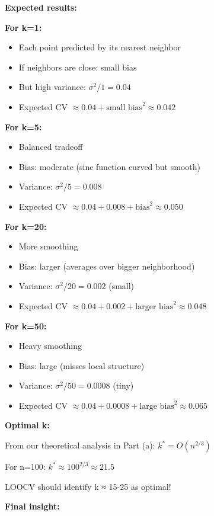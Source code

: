 \documentclass[12pt]{article}
\begin{document}
\begin{explanation}
\textbf{Expected results:}

\textbf{For k=1:}
\begin{itemize}
    \item Each point predicted by its nearest neighbor
    \item If neighbors are close: small bias
    \item But high variance: $\sigma^2/1 = 0.04$
    \item Expected CV $\approx 0.04 + \text{small bias}^2 \approx 0.042$
\end{itemize}

\textbf{For k=5:}
\begin{itemize}
    \item Balanced tradeoff
    \item Bias: moderate (sine function curved but smooth)
    \item Variance: $\sigma^2/5 = 0.008$
    \item Expected CV $\approx 0.04 + 0.008 + \text{bias}^2 \approx 0.050$
\end{itemize}

\textbf{For k=20:}
\begin{itemize}
    \item More smoothing
    \item Bias: larger (averages over bigger neighborhood)
    \item Variance: $\sigma^2/20 = 0.002$ (small)
    \item Expected CV $\approx 0.04 + 0.002 + \text{larger bias}^2 \approx 0.048$
\end{itemize}

\textbf{For k=50:}
\begin{itemize}
    \item Heavy smoothing
    \item Bias: large (misses local structure)
    \item Variance: $\sigma^2/50 = 0.0008$ (tiny)
    \item Expected CV $\approx 0.04 + 0.0008 + \text{large bias}^2 \approx 0.065$
\end{itemize}

\textbf{Optimal k:}

From our theoretical analysis in Part (a): $k^* = O(n^{2/3})$

For n=100: $k^* \approx 100^{2/3} \approx 21.5$

LOOCV should identify k ≈ 15-25 as optimal!

\textbf{Final insight:}


\end{explanation}
\end{document}
